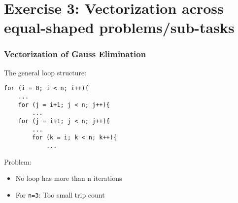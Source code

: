 \section{Exercise 3: Vectorization across equal-shaped problems/sub-tasks}
\begin{frame}[fragile]
\frametitle{Vectorization of Gauss Elimination}
The general loop structure:
\codestylec
\begin{lstlisting}
for (i = 0; i < n; i++){
    ...
    for (j = i+1; j < n; j++){
        ...
    for (j = i+1; j < n; j++){
        ...
        for (k = i; k < n; k++){
            ...                   
\end{lstlisting}
Problem:
\begin{itemize}
\item No loop has more than n iterations
\item For \texttt{n=3}: Too small trip count
\end{itemize}
\end{frame}
